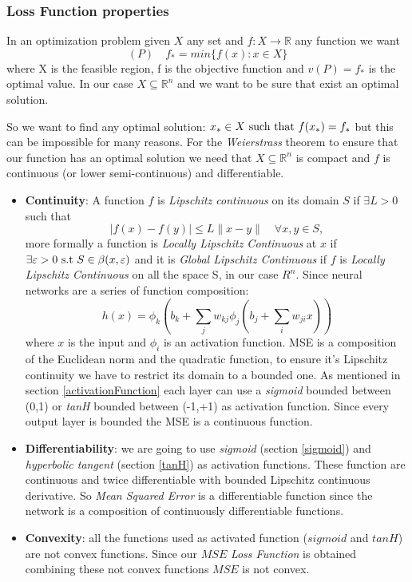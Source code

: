 \subsubsection{Loss Function properties}
\label{LF:Properties}
In an optimization problem given $X$ any set and $f: X \rightarrow \mathbb{R}$ any function we want
\begin{equation}
(P) \quad f_{*} = min \{f(x) : x \in X\}
\end{equation}
where X is the feasible region, f is the objective function and $v(P) = f_{*}$ is the optimal value. In our case $X \subseteq \mathbb{R}^{n}$ and we want to be sure that exist an optimal solution.

So we want to find any optimal solution: $x_{*} \in X  \textnormal{ such that } f(x_{*}) = f_{*}$ but this can be impossible for many reasons. For the \textit{Weierstrass} theorem to ensure that our function has an optimal solution we need that $X \subseteq \mathbb{R}^{n}$ is compact and $f$ is continuous (or lower semi-continuous) and differentiable. 

\begin{itemize}
	\item \textbf{Continuity}: A function $f$ is \textit{ Lipschitz continuous} on its domain $S$ if $\exists L>0$ such that
	\begin{equation}
	|f(x)-f(y)| \leq L\parallel x-y\parallel \quad \forall x,y \in S,  
	\end{equation} 
	more formally a function is  \textit{Locally Lipschitz Continuous} at $x$ if $\exists \varepsilon >0 \textnormal{ s.t } S \in \beta(x,\varepsilon) $
	and it is \textit{Global Lipschitz Continuous} if $f$ is \textit{Locally Lipschitz Continuous} on all the space S, in our case $R^n$.
	Since neural networks are a series of function composition: 
	\begin{equation}
	h(x) = \phi_{k}(b_{k} + \sum_{j}w_{kj} \phi_{j}(b_{j} + \sum_{i}w_{ji}x))
	\end{equation}
	where $x$ is the input and $\phi_{i}$ is an activation function. MSE is a composition of the Euclidean norm and the quadratic function, to ensure it's Lipschitz continuity we have to restrict its domain to a bounded one. As mentioned in section \ref{activationFunction} each layer can use a \textit{sigmoid} bounded between (0,1) or \textit{tanH} bounded between (-1,+1) as activation function. Since every output layer is bounded the MSE is a continuous function.
	
	\item  \textbf{Differentiability}:  we are going to use \textit{sigmoid} (section \ref{sigmoid}) and \textit{hyperbolic tangent} (section \ref{tanH}) as activation functions. These function are continuous and twice differentiable with bounded Lipschitz continuous derivative. So \textit{Mean Squared Error} is a differentiable function since the network is a composition of continuously differentiable functions.
	\item \textbf{Convexity}: all the functions used as activated function ($sigmoid$ and $tanH$) are not convex functions. Since our $MSE$ \textit{Loss Function} is obtained combining these not convex functions $MSE$ is not convex.
\end{itemize}

